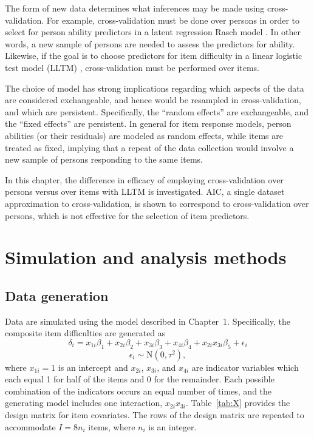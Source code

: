 \documentclass[12pt, letterpaper]{article}
\begin{document}
The form of new data determines what inferences may be made using cross-validation. For example, cross-validation must be done over persons in order to select for person ability predictors in a latent regression Rasch model \cite{}. In other words, a new sample of persons are needed to assess the predictors for ability. Likewise, if the goal is to choose predictors for item difficulty in a linear logistic test model (LLTM) \cite{}, cross-validation must be performed over items. 

The choice of model has strong implications regarding which aspects of the data are considered exchangeable, and hence would be resampled in cross-validation, and which are persistent. Specifically, the ``random effects'' are exchangeable, and the ``fixed effects'' are persistent. In general for item response models, person abilities (or their residuals) are modeled as random effects, while items are treated as fixed, implying that a repeat of the data collection would involve a new sample of persons responding to the same items.

In this chapter, the difference in efficacy of employing cross-validation over persons versus over items with LLTM is investigated. AIC, a single dataset approximation to cross-validation, is shown to correspond to cross-validation over persons, which is not effective for the selection of item predictors.


\section{Simulation and analysis methods}

\subsection{Data generation}

Data are simulated using the model described in Chapter~1. 
Specifically, the composite item difficulties are generated as
\begin{equation}
	\delta_i = x_{1i}\beta_1 + x_{2i}\beta_2 + x_{3i}\beta_3 + x_{4i}\beta_4 + x_{2i}x_{3i}\beta_5 + \epsilon_i
\end{equation}
\begin{equation}
	\epsilon_i \sim \mathrm{N}(0, \tau^2)
,\end{equation}
where $x_{1i} = 1$ is an intercept and $x_{2i}$, $x_{3i}$, and $x_{4i}$ are indicator variables which each equal 1 for half of the items and 0 for the remainder. Each possible combination of the indicators occurs an equal number of times, and the generating model includes one interaction, $x_{2i}x_{3i}$. Table~\ref{tab:X} provides the design matrix for item covariates. The rows of the design matrix are repeated to accommodate $I = 8n_i$ items, where $n_i$ is an integer.
\end{document}
